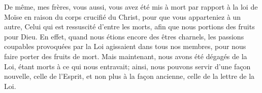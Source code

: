 De même, mes frères, vous aussi,
	vous avez été mis à mort par rapport à la loi de Moïse
		en raison du corps crucifié du Christ,
	pour que vous apparteniez à un autre,
		Celui qui est ressuscité d’entre les morts,
	afin que nous portions des fruits pour Dieu.
En effet, quand nous étions encore des êtres charnels,
	les passions coupables provoquées par la Loi
		agissaient dans tous nos membres,
	pour nous faire porter des fruits de mort.
Mais maintenant, nous avons été dégagés de la Loi,
	étant morts à ce qui nous entravait;
	ainsi, nous pouvons servir d’une façon nouvelle, celle de l’Esprit,
	et non plus à la façon ancienne, celle de la lettre de la Loi.
